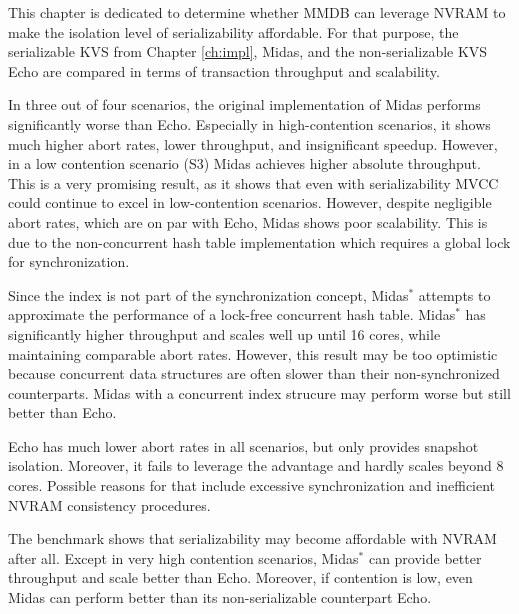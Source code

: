 This chapter is dedicated to determine whether MMDB can leverage NVRAM to make
the isolation level of serializability affordable. For that purpose, the
serializable KVS from Chapter \ref{ch:impl}, Midas, and the non-serializable KVS
Echo are compared in terms of transaction throughput and scalability.

In three out of four scenarios, the original implementation of Midas performs
significantly worse than Echo. Especially in high-contention scenarios, it shows
much higher abort rates, lower throughput, and insignificant speedup. However,
in a low contention scenario (S3) Midas achieves higher absolute throughput.
This is a very promising result, as it shows that even with serializability MVCC
could continue to excel in low-contention scenarios. However, despite negligible
abort rates, which are on par with Echo, Midas shows poor scalability. This is
due to the non-concurrent hash table implementation which requires a global lock
for synchronization.

Since the index is not part of the synchronization concept, Midas$^{*}$ attempts
to approximate the performance of a lock-free concurrent hash table. Midas$^{*}$
has significantly higher throughput and scales well up until 16 cores, while
maintaining comparable abort rates. However, this result may be too optimistic
because concurrent data structures are often slower than their non-synchronized
counterparts. Midas with a concurrent index strucure may perform worse but still
better than Echo.

Echo has much lower abort rates in all scenarios, but only provides snapshot
isolation. Moreover, it fails to leverage the advantage and hardly scales beyond
8 cores. Possible reasons for that include excessive synchronization and
inefficient NVRAM consistency procedures.

The benchmark shows that serializability may become affordable with NVRAM after
all. Except in very high contention scenarios, Midas$^{*}$ can provide better
throughput and scale better than Echo. Moreover, if contention is low, even
Midas can perform better than its non-serializable counterpart Echo.
